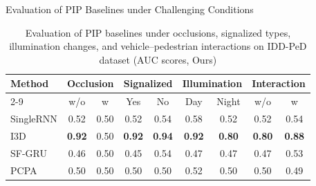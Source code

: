 \documentclass[
	11pt, %
]{beamer}
\begin{document}
\begin{frame}{Evaluation of PIP Baselines under Challenging Conditions}
\begin{table}[ht]
\centering
\scriptsize
\begin{tabular}{lcccccccc}
\hline
\textbf{Method} 
& \multicolumn{2}{c}{\textbf{Occlusion}} 
& \multicolumn{2}{c}{\textbf{Signalized}} 
& \multicolumn{2}{c}{\textbf{Illumination}} 
& \multicolumn{2}{c}{\textbf{Interaction}} \\
\cline{2-9}

& w/o & w
& Yes & No
& Day & Night
& w/o & w \\
\hline
SingleRNN
& 0.52 & 0.50
& 0.52 & 0.54
& 0.58 & 0.52
& 0.52 & 0.54 \\

I3D
& \textbf{0.92} & 0.50
& \textbf{0.92} & \textbf{0.94}
& \textbf{0.92} & \textbf{0.80}
& \textbf{0.80} & \textbf{0.88} \\

SF-GRU
& 0.46 & 0.50
& 0.45 & 0.54
& 0.47 & 0.47
& 0.47 & 0.53 \\

PCPA
& 0.50 & 0.50
& 0.50 & 0.50
& 0.52 & 0.50
& 0.50 & 0.49 \\
\hline
\end{tabular}
\caption{Evaluation of PIP baselines under occlusions, signalized types, illumination changes, and vehicle--pedestrian interactions on IDD-PeD dataset (AUC scores, Ours)}
\end{table}
\end{frame}
\end{document}
